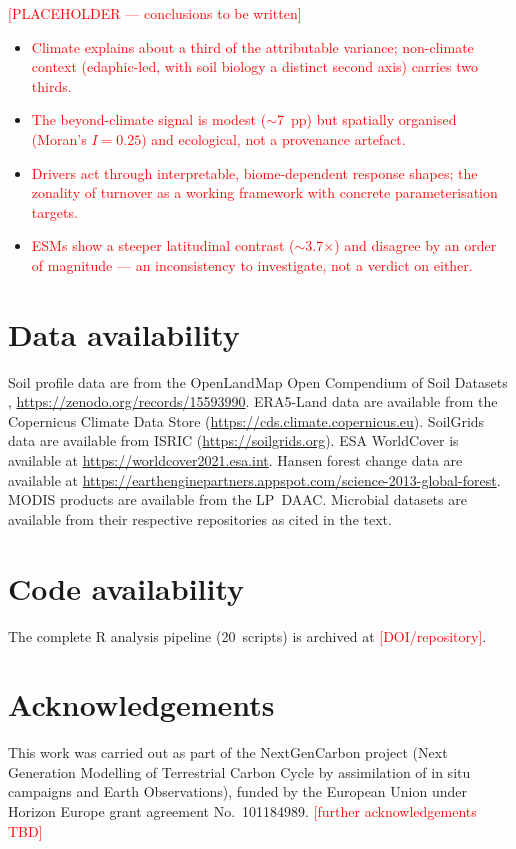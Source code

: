 \documentclass[12pt, a4paper]{article}
\newcommand{\PH}[1]{\textcolor{red}{#1}}
\begin{document}
\PH{[PLACEHOLDER --- conclusions to be written]}
\begin{itemize}
\item \PH{Climate explains about a third of the attributable variance; non-climate context (edaphic-led, with soil biology a distinct second axis) carries two thirds.}
\item \PH{The beyond-climate signal is modest ($\sim$7~pp) but spatially organised (Moran's $I=0.25$) and ecological, not a provenance artefact.}
\item \PH{Drivers act through interpretable, biome-dependent response shapes; the zonality of turnover as a working framework with concrete parameterisation targets.}
\item \PH{ESMs show a steeper latitudinal contrast ($\sim$3.7$\times$) and disagree by an order of magnitude --- an inconsistency to investigate, not a verdict on either.}
\end{itemize}


\section*{Data availability}

Soil profile data are from the OpenLandMap Open Compendium of Soil
Datasets \citep{OpenLandMapSoilDB2025}, \url{https://zenodo.org/records/15593990}.
ERA5-Land data are available from the Copernicus Climate Data Store
(\url{https://cds.climate.copernicus.eu}).
SoilGrids data are available from ISRIC (\url{https://soilgrids.org}).
ESA WorldCover is available at \url{https://worldcover2021.esa.int}.
Hansen forest change data are available at
\url{https://earthenginepartners.appspot.com/science-2013-global-forest}.
MODIS products are available from the LP~DAAC.
Microbial datasets are available from their respective repositories as
cited in the text.

\section*{Code availability}

The complete R analysis pipeline (20~scripts) is archived at
\PH{[DOI/repository]}.

\section*{Acknowledgements}
This work was carried out as part of the NextGenCarbon project (Next Generation
Modelling of Terrestrial Carbon Cycle by assimilation of in situ campaigns and
Earth Observations), funded by the European Union under Horizon Europe grant
agreement No.~101184989. \PH{[further acknowledgements TBD]}
\end{document}
